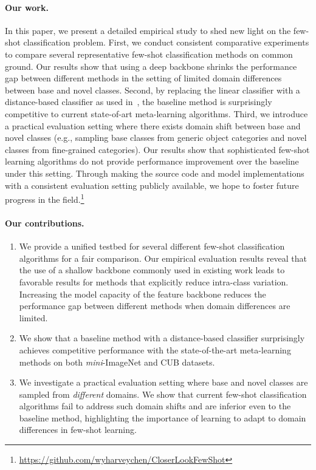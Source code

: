 \paragraph{Our work.} In this paper, we present a detailed empirical study to shed new light on the few-shot classification problem. First, we conduct consistent comparative experiments to compare several representative few-shot classification methods on common ground. Our results show that using a deep backbone shrinks the performance gap between different methods in the setting of limited domain differences between base and novel classes. Second, by replacing the linear classifier with a distance-based classifier as used in~\cite{gidaris2018dynamic,qi2018low}, the baseline method is surprisingly competitive to current state-of-art meta-learning algorithms. Third, we introduce a practical evaluation setting where there exists domain shift between base and novel classes (e.g., sampling base classes from generic object categories and novel classes from fine-grained categories). Our results show that sophisticated few-shot learning algorithms do not provide performance improvement over the baseline under this setting. Through making the source code and model implementations with a consistent evaluation setting publicly available, we hope to foster future progress in the field.\footnote{\url{https://github.com/wyharveychen/CloserLookFewShot}}

\paragraph{Our contributions.}

\begin{enumerate}[leftmargin=*]
\item We provide a unified testbed for several different few-shot classification algorithms for a fair comparison. Our empirical evaluation results reveal that the use of a shallow backbone commonly used in existing work leads to favorable results for methods that explicitly reduce intra-class variation. Increasing the model capacity of the feature backbone reduces the performance gap between different methods when domain differences are limited.

\item We show that a baseline method with a distance-based classifier surprisingly achieves competitive performance with the state-of-the-art meta-learning methods on both \emph{mini}-ImageNet  and CUB datasets.

\item We investigate a practical evaluation setting where base and novel classes are sampled from \emph{different} domains. We show that current few-shot classification algorithms fail to address such domain shifts and are inferior even to the baseline method, highlighting the importance of learning to adapt to domain differences in few-shot learning.

\end{enumerate}

